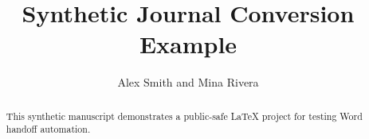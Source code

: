 \documentclass{article}
\title{Synthetic Journal Conversion Example}
\author{Alex Smith and Mina Rivera}
\begin{document}
\maketitle

\begin{abstract}
This synthetic manuscript demonstrates a public-safe LaTeX project for testing Word handoff automation.
\end{abstract}







\end{document}
